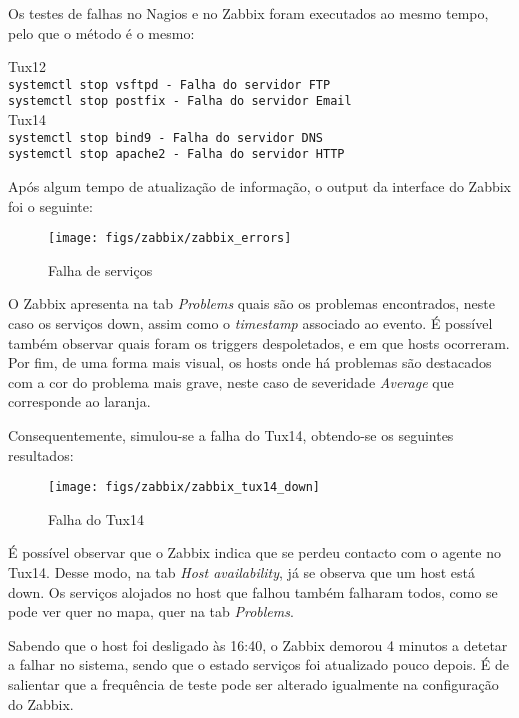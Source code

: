 Os testes de falhas no Nagios e no Zabbix foram executados ao mesmo tempo, pelo que o método é o mesmo:
\begin{center}
    Tux12 \\
    \verb|systemctl stop vsftpd - Falha do servidor FTP| \\
    \verb|systemctl stop postfix - Falha do servidor Email| \\

    \vspace{1cm}
    Tux14 \\
    \verb|systemctl stop bind9 - Falha do servidor DNS| \\
    \verb|systemctl stop apache2 - Falha do servidor HTTP|
\end{center}

Após algum tempo de atualização de informação, o output da interface do Zabbix foi o seguinte:

\begin{figure}[H]
    \centering
    \texttt{[image: figs/zabbix/zabbix\_errors]}
    \caption{Falha de serviços}
    \label{fig:zabbix_errors}
\end{figure}

O Zabbix apresenta na tab \textit{Problems} quais são os problemas encontrados, neste caso os serviços down, assim como o \textit{timestamp} associado ao evento.
É possível também observar quais foram os triggers despoletados, e em que hosts ocorreram.
Por fim, de uma forma mais visual, os hosts onde há problemas são destacados com a cor do problema mais grave, neste caso de severidade \textit{Average} que corresponde ao laranja.

Consequentemente, simulou-se a falha do Tux14, obtendo-se os seguintes resultados:

\begin{figure}[H]
    \centering
    \texttt{[image: figs/zabbix/zabbix\_tux14\_down]}
    \caption{Falha do Tux14}
    \label{fig:zabbix_tux14_down}
\end{figure}

É possível observar que o Zabbix indica que se perdeu contacto com o agente no Tux14.
Desse modo, na tab \textit{Host availability}, já se observa que um host está down.
Os serviços alojados no host que falhou também falharam todos, como se pode ver quer no mapa, quer na tab \textit{Problems}.

Sabendo que o host foi desligado às 16:40, o Zabbix demorou 4 minutos a detetar a falhar no sistema, sendo que o estado serviços foi atualizado pouco depois.
É de salientar que a frequência de teste pode ser alterado igualmente na configuração do Zabbix.
